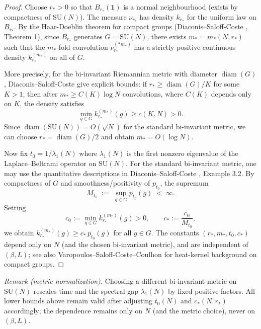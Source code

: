\documentclass[11pt]{amsart}
\theoremstyle{plain}
\theoremstyle{definition}
\theoremstyle{remark}
\begin{document}
\begin{proof}
Choose $r_*>0$ so that $B_{r_*}(\mathbf 1)$ is a normal neighbourhood (exists by compactness of $\mathrm{SU}(N)$). The measure $\nu_{r_*}$ has density $k_{r_*}$ for the uniform law on $B_{r_*}$. By the Haar-Doeblin theorem for compact groups (Diaconis--Saloff-Coste \cite{DiaconisSaloffCoste2004}, Theorem 1), since $B_{r_*}$ generates $G=\mathrm{SU}(N)$, there exists $m_*=m_*(N,r_*)$ such that the $m_*$-fold convolution $\nu_{r_*}^{(*m_*)}$ has a strictly positive continuous density $k_{r_*}^{(m_*)}$ on all of $G$.

More precisely, for the bi-invariant Riemannian metric with diameter $\operatorname{diam}(G)$, Diaconis--Saloff-Coste give explicit bounds: if $r_* \ge \operatorname{diam}(G)/K$ for some $K>1$, then after $m_* \ge C(K)\log N$ convolutions, where $C(K)$ depends only on $K$, the density satisfies
\[
  \min_{g\in G} k_{r_*}^{(m_*)}(g) \ge c(K,N) > 0.
\]
Since $\operatorname{diam}(\mathrm{SU}(N)) = O(\sqrt{N})$ for the standard bi-invariant metric, we can choose $r_* = \operatorname{diam}(G)/2$ and obtain $m_* = O(\log N)$.

Now fix $t_0 = 1/\lambda_1(N)$ where $\lambda_1(N)$ is the first nonzero eigenvalue of the Laplace--Beltrami operator on $\mathrm{SU}(N)$. For the standard bi-invariant metric, one may use the quantitative descriptions in Diaconis--Saloff-Coste \cite{DiaconisSaloffCoste2004}, Example 3.2. By compactness of $G$ and smoothness/positivity of $p_{t_0}$, the supremum
\[
  M_{t_0} \;:=\; \sup_{g\in G} p_{t_0}(g) \;<\; \infty.
\]
Setting
\[
  c_0 := \min_{g\in G} k_{r_*}^{(m_*)}(g) > 0, \qquad c_* := \frac{c_0}{M_{t_0}},
\]
we obtain $k_{r_*}^{(m_*)}(g) \ge c_*\, p_{t_0}(g)$ for all $g \in G$. The constants $(r_*, m_*, t_0, c_*)$ depend only on $N$ (and the chosen bi-invariant metric), and are independent of $(\beta,L)$; see also Varopoulos--Saloff-Coste--Coulhon \cite{VaropoulosSaloffCosteCoulhon1992} for heat-kernel background on compact groups.
\end{proof}

\noindent\emph{Remark (metric normalization).} Choosing a different bi-invariant metric on $\mathrm{SU}(N)$ rescales time and the spectral gap $\lambda_1(N)$ by fixed positive factors. All lower bounds above remain valid after adjusting $t_0(N)$ and $c_*(N,r_*)$ accordingly; the dependence remains only on $N$ (and the metric choice), never on $(\beta,L)$.
\end{document}
